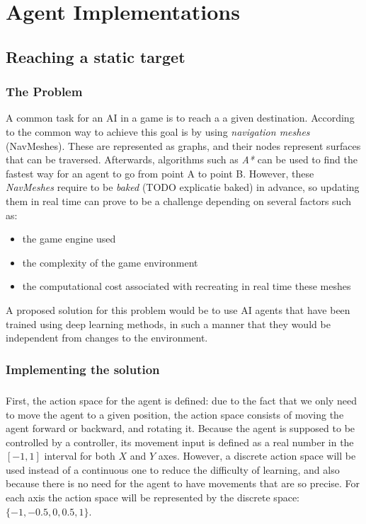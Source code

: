 \chapter{Agent Implementations}
\section{Reaching a static target}
\subsection{The Problem} \label{static_target:the_problem}
A common task for an AI in a game is to reach a a given destination. According to \cite{alonso2020deeplearningnavigation} the common way to achieve this goal is by using \emph{navigation meshes} (NavMeshes). These are represented as graphs, and their nodes represent surfaces that can be traversed. Afterwards, algorithms such as \emph{A*} can be used to find the fastest way for an agent to go from point A to point B. However, these \emph{NavMeshes} require to be \emph{baked} (TODO explicatie baked) in advance, so updating them in real time can prove to be a challenge depending on several factors such as:
\begin{itemize}
    \item the game engine used
    \item the complexity of the game environment
    \item the computational cost associated with recreating in real time these meshes
\end{itemize}

A proposed solution for this problem would be to use AI agents that have been trained using deep learning methods, in such a manner that they would be independent from changes to the environment.

\subsection{Implementing the solution} \label{static_target:implementation}
\paragraph{}
First, the action space for the agent is defined: due to the fact that we only need to move the agent to a given position, the action space consists of moving the agent forward or backward, and rotating it. Because the agent is supposed to be controlled by a controller, its movement input is defined as a real number in the $[-1, 1]$ interval for both $X$ and $Y$ axes. However, a discrete action space will be used instead of a continuous one to reduce the difficulty of learning, and also because there is no need for the agent to have movements that are so precise. For each axis the action space will be represented by the discrete space: $\{-1, -0.5, 0, 0.5, 1\}$.

